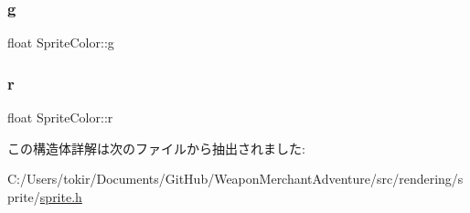 \mbox{\label{struct_sprite_color_ae59c4c99310c60ac72740f83a3073a44}} 
\subsubsection{\texorpdfstring{g}{g}}
{\footnotesize\ttfamily float Sprite\+Color\+::g}

\mbox{\label{struct_sprite_color_a640d8864838a78db2a9d5f1840e24882}} 
\subsubsection{\texorpdfstring{r}{r}}
{\footnotesize\ttfamily float Sprite\+Color\+::r}



この構造体詳解は次のファイルから抽出されました\+:\begin{DoxyCompactItemize}
\item 
C\+:/\+Users/tokir/\+Documents/\+Git\+Hub/\+Weapon\+Merchant\+Adventure/src/rendering/sprite/\mbox{\hyperlink{sprite_8h}{sprite.\+h}}\end{DoxyCompactItemize}
